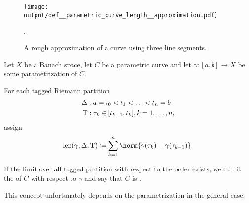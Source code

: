 \begin{definition}\label{def:arc_length}
  \begin{figure}[!ht]
    \centering
    \texttt{[image: output/def\_\_parametric\_curve\_length\_\_approximation.pdf]}
    \caption{A rough approximation of a curve using three line segments.}\label{def:arc_length/approximation}.
  \end{figure}

  Let \( X \) be a \hyperref[def:banach_space]{Banach space}, let \( C \) be a \hyperref[def:parametric_curve]{parametric curve} and let \( \gamma: [a, b] \to X \) be some parametrization of \( C \).

  For each \hyperref[def:riemann_partition/tagged]{tagged Riemann partition}
  \begin{equation*}
    \begin{aligned}
      &\Delta: a = t_0 < t_1 < \ldots < t_n = b \\
      &\operatorname{T}: \tau_k \in [t_{k-1}, t_k], k = 1, \ldots, n,
    \end{aligned}
  \end{equation*}
  assign
  \begin{equation*}
    \len(\gamma, \Delta, \Tau) \coloneqq \sum_{k=1}^n \norm{\gamma(\tau_k) - \gamma(\tau_{k-1})}.
  \end{equation*}

  If the limit over all tagged partition with respect to the order  exists, we call it the  of \( C \) with respect to \( \gamma \) and say that \( C \) is .

  This concept unfortunately depends on the parametrization in the general case.
\end{definition}

